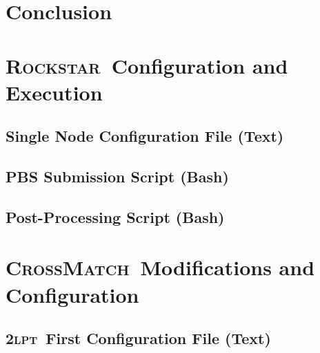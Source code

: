 \documentclass[12pt]{report}
\newcommand{\lpt}{\textsc{2lpt}}
\newcommand{\rockstar}{\textsc{Rockstar}}
\newcommand{\crossmatch}{\textsc{CrossMatch}}
\begin{document}







\chapter{Conclusion}
\label{chap:conclusion}




\singlespacing
%




\begin{appendices}

	\chapter{\rockstar\ Configuration and Execution}
	\label{app:rockstar}
	\section{Single Node Configuration File (Text)}
	\label{app:onenode}
	
	\section{PBS Submission Script (Bash)}
	\label{app:run_rockstar}
	
	\section{Post-Processing Script (Bash)}
	\label{app:postprocess}
	

	\chapter{\crossmatch\ Modifications and Configuration}
	\label{app:crossmatch}
	\section{\lpt\ First Configuration File (Text)}
	\label{app:crossmatch_2lpt_config}
	

\end{appendices}
\end{document}
